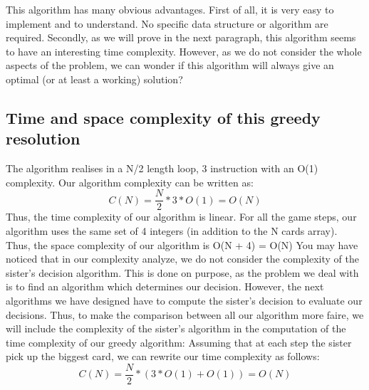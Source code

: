 \documentclass[a4paper,10pt]{article}
\begin{document}
    This algorithm has many obvious advantages.  First of all, it is very easy to implement and to understand.  No specific data structure or algorithm are required.
    Secondly, as we will prove in the next paragraph, this algorithm seems to have an interesting time complexity.
    However, as we do not consider the whole aspects of the problem, we can wonder if this algorithm will always give an optimal (or at least a working) solution?

    \subsection{Time and space complexity of this greedy resolution}
    The algorithm realises in a N/2 length loop, 3 instruction with an O(1) complexity.
    Our algorithm complexity can be written as:
    \begin{equation}C(N) = \frac{N}{2} * 3*O(1) = O(N) \end{equation}
    Thus, the time complexity of our algorithm is linear.\newline
    For all the game steps, our algorithm uses the same set of 4 integers (in addition to the N cards array).\newline
    Thus, the space complexity of our algorithm is O(N + 4) = O(N)\newline
    \newline
    You may have noticed that in our complexity analyze, we do not consider the complexity of the sister's decision algorithm.  
    This is done on purpose, as the problem we deal with is to find an algorithm which determines our decision.  
    However, the next algorithms we have designed have to compute the sister's decision to evaluate our decisions.   
    Thus, to make the comparison between all our algorithm more faire, we will include the complexity of the sister's algorithm in the computation of the time complexity of our greedy algorithm:\newline
    Assuming that at each step the sister pick up the biggest card, we can rewrite our time complexity as follows:
    \begin{equation}C(N) = \frac{N}{2} * (3*O(1) + O(1)) = O(N) \end{equation}
    
    
    
\end{document}
